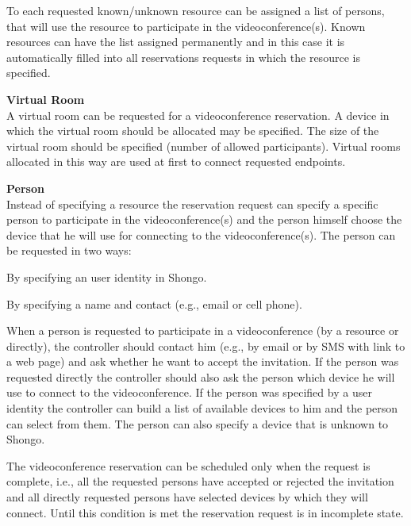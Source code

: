 \begin{compactenum}
  \vspace{1mm} To each requested known/unknown resource can be assigned a 
  list of persons, that will use the resource to participate in the 
  videoconference(s). Known resources can have the list assigned permanently 
  and in this case it is automatically filled into all reservations requests 
  in which  the resource is specified. 
\item \textbf{Virtual Room} \\
  A virtual room can be requested for a videoconference reservation. A device
  in which the virtual room should be allocated may be specified. The size
  of the virtual room should be specified (number of allowed participants).
  Virtual rooms allocated in this way are used at first to connect 
  requested endpoints.
\item \textbf{Person} \\
  Instead of specifying a resource the reservation request can specify a 
  specific  person to participate in the videoconference(s) and the person 
  himself choose the device that he will use for connecting to the 
  videoconference(s). The person can be requested in two ways:
  \begin{compactenum}
  \item By specifying an user identity in Shongo.
  \item By specifying a name and contact (e.g., email or cell phone).
  \end{compactenum}
\end{compactenum}
When a person is requested to participate in a videoconference (by a resource or directly), the controller should contact him (e.g., by email or by SMS with link to a web page) and ask whether he want to accept the invitation. If the person was requested directly the controller should also ask the person which device he will use to connect to the videoconference. If the person was specified by a user identity the controller can build a list of available devices to him and the person can select from them. The person can also specify a device that is unknown to Shongo. 

The videoconference reservation can be scheduled only when the request is complete, i.e., all the requested persons have accepted or rejected the invitation and all directly requested persons have selected devices by which they will connect. Until this condition is met the reservation request is in incomplete state.


